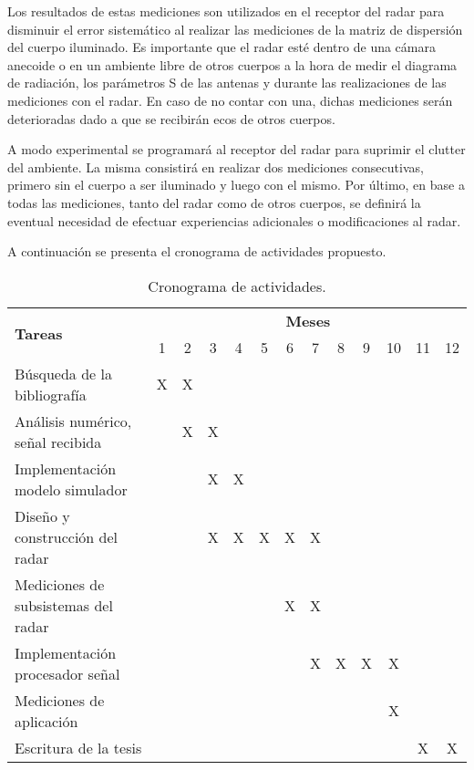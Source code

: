 Los resultados de estas mediciones son utilizados en el receptor del radar para disminuir el error sistemático al realizar las mediciones de la matriz de dispersión del cuerpo iluminado. Es importante que el radar esté dentro de una cámara anecoide o en un ambiente libre de otros cuerpos a la hora de medir el diagrama de radiación, los parámetros S de las antenas y durante las realizaciones de las mediciones con el radar. En caso de no contar con una, dichas mediciones serán deterioradas dado a que se recibirán ecos de otros cuerpos.

A modo experimental se programará al receptor del radar para suprimir el clutter del ambiente. La misma consistirá en realizar dos mediciones consecutivas, primero sin el cuerpo a ser iluminado y luego con el mismo. Por último, en base a todas las mediciones, tanto del radar como de otros cuerpos, se definirá la eventual necesidad de efectuar experiencias adicionales o modificaciones al radar.

A continuación se presenta el cronograma de actividades propuesto.

\begin{table}[htb]
  \caption{Cronograma de actividades.}
  \centering
  \label{tab:antennasParameters}
  \begin{tabular}{l *{12}{c}}
  \toprule
  \multirow{2}{*}{\textbf{Tareas}} & \multicolumn{12}{c}{\textbf{Meses}} \tabularnewline
  \cmidrule{2-13}
   & 1 & 2 & 3 & 4 & 5 & 6 & 7 & 8 & 9 & 10 & 11 & 12 \tabularnewline
  \midrule

  Búsqueda de la bibliografía & X & X & & & & & & & & & & \tabularnewline

  Análisis numérico, señal recibida & & X & X & & & & & & & & & \tabularnewline

  Implementación modelo simulador & & & X & X & & & & & & & & \tabularnewline

  Diseño y construcción del radar & & & X & X & X & X & X & & & & & \tabularnewline

  Mediciones de subsistemas del radar & & & & & & X & X & & & & & \tabularnewline

  Implementación procesador señal  & & & & & & & X & X & X & X & & \tabularnewline

  Mediciones de aplicación & & & & & & & & & & X & & \tabularnewline

  Escritura de la tesis & & & & & & & & & & & X & X \tabularnewline

  \bottomrule
  \end{tabular}
\end{table}
